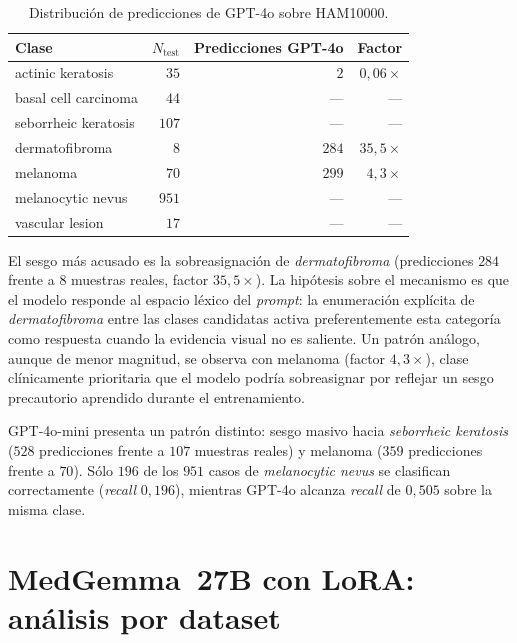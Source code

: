 \begin{table}[H]
\centering
\footnotesize
\setlength{\tabcolsep}{4pt}
\renewcommand{\arraystretch}{0.95}
\caption{Distribución de predicciones de GPT-4o sobre HAM10000.}
\label{tab:anexoh-confusion-gpt4o}
\begin{tabular}{lrrr}
\hline
Clase                       & $N_{\mathrm{test}}$ & Predicciones GPT-4o & Factor \\
\hline
actinic keratosis           & $35$    & $2$    & $0{,}06\times$ \\
basal cell carcinoma        & $44$    & ---    & --- \\
seborrheic keratosis        & $107$   & ---    & --- \\
dermatofibroma              & $8$     & $284$  & $35{,}5\times$ \\
melanoma                    & $70$    & $299$  & $4{,}3\times$ \\
melanocytic nevus           & $951$   & ---    & --- \\
vascular lesion             & $17$    & ---    & --- \\
\hline
\end{tabular}
\end{table}

El sesgo más acusado es la sobreasignación de \emph{dermatofibroma}
(predicciones $284$ frente a $8$ muestras reales, factor
$35{,}5\times$). La hipótesis sobre el mecanismo es que el modelo
responde al espacio léxico del \emph{prompt}: la enumeración
explícita de \emph{dermatofibroma} entre las clases candidatas
activa preferentemente esta categoría como respuesta cuando la
evidencia visual no es saliente. Un patrón análogo, aunque de
menor magnitud, se observa con melanoma (factor $4{,}3\times$),
clase clínicamente prioritaria que el modelo podría sobreasignar
por reflejar un sesgo precautorio aprendido durante el
entrenamiento.

GPT-4o-mini presenta un patrón distinto: sesgo masivo hacia
\emph{seborrheic keratosis} ($528$ predicciones frente a
$107$ muestras reales) y melanoma ($359$ predicciones frente
a $70$). Sólo $196$ de los $951$ casos de
\emph{melanocytic nevus} se clasifican correctamente
(\emph{recall} $0{,}196$), mientras GPT-4o alcanza
\emph{recall} de $0{,}505$ sobre la misma clase.

\section{MedGemma~27B con LoRA: análisis por dataset}
\label{sec:anexoh-medgemma}

